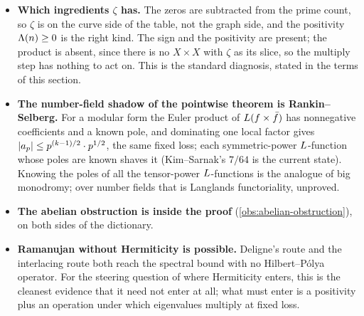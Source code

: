 \begin{itemize}
  \item \textbf{Which ingredients $\zeta$ has.} The zeros are subtracted from the prime count, so
$\zeta$ is on the curve side of the table, not the graph side, and the positivity $\Lambda(n)\ge0$ is the right
kind. The sign and the positivity are present; the product is absent, since there is no $X\times X$ with
$\zeta$ as its slice, so the multiply step has nothing to act on. This is the standard diagnosis, stated in
the terms of this section.
  \item \textbf{The number-field shadow of the pointwise theorem is Rankin--Selberg.} For a modular
form the Euler product of $L(f\times\bar f)$ has nonnegative coefficients and a known pole, and
dominating one local factor gives $|a_p| \le p^{(k-1)/2}\cdot p^{1/2}$, the same fixed loss; each
symmetric-power $L$-function whose poles are known shaves it (Kim--Sarnak's $7/64$ is the current
state). Knowing the poles of all the tensor-power $L$-functions is the analogue of big monodromy; over
number fields that is Langlands functoriality, unproved.
  \item \textbf{The abelian obstruction is inside the proof} (\cref{obs:abelian-obstruction}), on
  both sides of the dictionary.
  \item \textbf{Ramanujan without Hermiticity is possible.} Deligne's route and the interlacing
route both reach the spectral bound with no Hilbert--P\'olya operator. For the steering question of where
Hermiticity enters, this is the cleanest evidence that it need not enter at all; what must enter is a
positivity plus an operation under which eigenvalues multiply at fixed loss.
\end{itemize}
